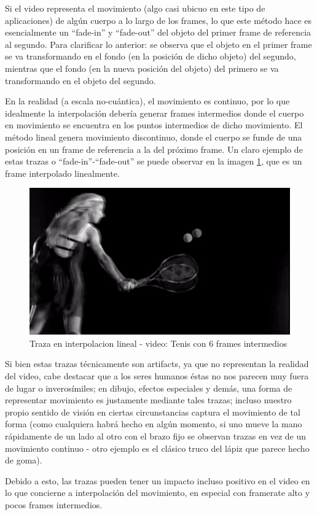 \par Si el video representa el movimiento (algo casi ubicuo en este tipo de aplicaciones) de alg\'un cuerpo a lo largo de los frames, lo que este m\'etodo hace es esencialmente un ``fade-in'' y ``fade-out'' del objeto del primer frame de referencia al segundo.
Para clarificar lo anterior: se observa que el objeto en el primer frame se va transformando en el fondo (en la posici\'on de dicho objeto) del segundo, mientras que el fondo (en la nueva posici\'on del objeto) del primero se va transformando en el objeto del segundo.
\par En la realidad (a escala no-cu\'antica), el movimiento es continuo, por lo que idealmente la interpolaci\'on deber\'ia generar frames intermedios donde el cuerpo en movimiento se encuentra en los puntos intermedios de dicho movimiento.
El m\'etodo lineal genera movimiento discontinuo, donde el cuerpo se funde de una posici\'on en un frame de referencia a la del pr\'oximo frame.
Un claro ejemplo de estas trazas o ``fade-in''-``fade-out'' se puede observar en la imagen \ref{TenisTrazaLineal}, que es un frame interpolado linealmente.

\FloatBarrier
\begin{figure}[h]
\caption{Traza en interpolacion lineal - video: Tenis con 6 frames intermedios}
\label{TenisTrazaLineal}
\includegraphics[width=0.9\columnwidth]{imagenes/cualitativos/TTL.png}
\end{figure}
\FloatBarrier

\par Si bien estas trazas t\'ecnicamente son artifacts, ya que no representan la realidad del video, cabe destacar que a los seres humanos \'estas no nos parecen muy fuera de lugar o inveros\'imiles; en dibujo, efectos especiales y dem\'as, una forma de representar movimiento es justamente mediante tales trazas; incluso nuestro propio sentido de visi\'on en ciertas circunstancias captura el movimiento de tal forma (como cualquiera habr\'a hecho en alg\'un momento, si uno mueve la mano r\'apidamente de un lado al otro con el brazo fijo se observan trazas en vez de un movimiento continuo - otro ejemplo es el cl\'asico truco del l\'apiz que parece hecho de goma). 
\par Debido a esto, las trazas pueden tener un impacto incluso positivo en el video en lo que concierne a interpolaci\'on del movimiento, en especial con framerate alto y pocos frames intermedios.

